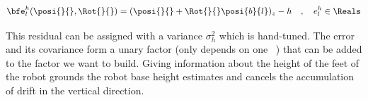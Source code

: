 \begin{equation}
    \bfe^h_l(\posi{}{}, \Rot{}{}) = (\posi{}{} + \Rot{}{} \posi{b}{l})_z - h \quad, \quad e^{h}_l \in \Reals
\end{equation}

This residual can be assigned with a variance $\sigma_h^2$ which is hand-tuned. 
The error and its covariance form a unary factor (only depends on one \keyframe\ ) 
that can be added to the factor we want to build.
Giving information about the height of the feet of the robot grounds the robot base height estimates and cancels the accumulation of drift in the vertical direction.



